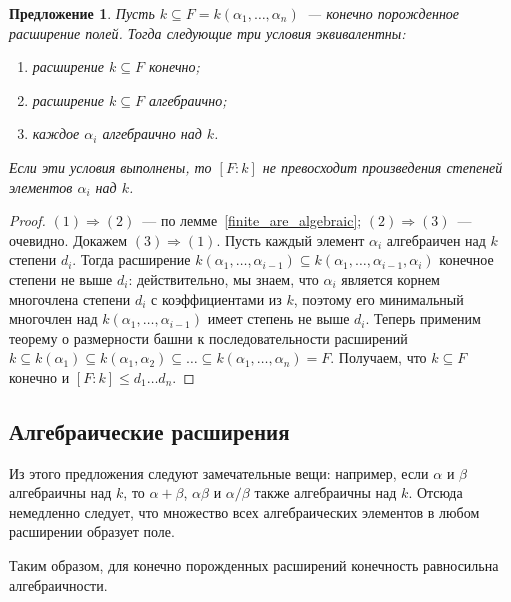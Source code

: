 \documentclass[a4paper,11pt]{scrartcl}
\theoremstyle{plain}
\newtheorem{proposition}[theorem]{Предложение}
\theoremstyle{definition}
\newcommand\sseq{\subseteq}
\begin{document}
\begin{proposition}
Пусть $k\sseq F=k(\alpha_1,\dots,\alpha_n)$~--- конечно порожденное
расширение полей. Тогда следующие три условия эквивалентны:
\begin{enumerate}
\item расширение $k\sseq F$ конечно;
\item расширение $k\sseq F$ алгебраично;
\item каждое $\alpha_i$ алгебраично над $k$.
\end{enumerate}
Если эти условия выполнены, то $[F:k]$ не превосходит произведения
степеней элементов $\alpha_i$ над $k$.
\end{proposition}
\begin{proof}
$(1)\Longrightarrow(2)$~--- по лемме~\ref{finite_are_algebraic};
$(2)\Longrightarrow(3)$~--- очевидно. Докажем
$(3)\Longrightarrow(1)$. Пусть каждый элемент $\alpha_i$ алгебраичен
над
$k$ степени $d_i$. Тогда расширение $k(\alpha_1,\dots,\alpha_
{i-1})\subseteq
k(\alpha_1,\dots,\alpha_{i-1},\alpha_i)$ конечное степени не выше
$d_i$:
действительно, мы знаем, что $\alpha_i$ является корнем многочлена
степени
$d_i$ с коэффициентами из $k$, поэтому его минимальный многочлен над
$k(\alpha_1,\dots,\alpha_{i-1})$ имеет степень не выше $d_i$. Теперь
применим
теорему о размерности башни к последовательности расширений
$k\subseteq k(\alpha_1)\subseteq k
(\alpha_1,\alpha_2)\subseteq\dots\subseteq
k(\alpha_1,\dots,\alpha_n)=F$. Получаем, что $k\subseteq F$ конечно и
$[F:k]\leq d_1\dots d_n$.
\end{proof}

\subsection{Алгебраические расширения}

Из этого предложения следуют замечательные вещи: например, если
$\alpha$ и
$\beta$ алгебраичны над $k$, то $\alpha+\beta$, $\alpha\beta$ и
$\alpha/\beta$ также
алгебраичны над $k$. Отсюда немедленно следует, что множество всех
алгебраических элементов в любом расширении образует поле.

Таким образом, для конечно порожденных расширений конечность
равносильна алгебраичности.
\end{document}
